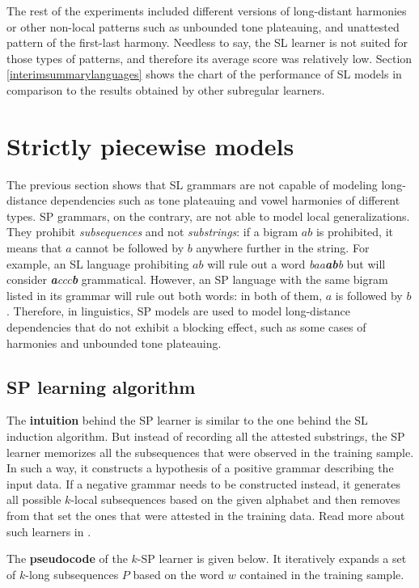 The rest of the experiments included different versions of long-distant harmonies or other non-local patterns such as unbounded tone plateauing, and unattested pattern of the first-last harmony.
Needless to say, the SL learner is not suited for those types of patterns, and therefore its average score was relatively low.
Section \ref{interimsummarylanguages} shows the chart of the performance of SL models in comparison to the results obtained by other subregular learners.

\section{Strictly piecewise models}

The previous section shows that SL grammars are not capable of modeling long-distance dependencies such as tone plateauing and vowel harmonies of different types.
SP grammars, on the contrary, are not able to model local generalizations.
They prohibit \emph{subsequences} and not \emph{substrings}: if a bigram $ab$ is prohibited, it means that $a$ cannot be followed by $b$ anywhere further in the string.
For example, an SL language prohibiting $ab$ will rule out a word \emph{baa\textbf{ab}b} but will consider \emph{\textbf{a}ccc\textbf{b}} grammatical.
However, an SP language with the same bigram listed in its grammar will rule out both words: in both of them, $a$ is followed by $b$.
Therefore, in linguistics, SP models are used to model long-distance dependencies that do not exhibit a blocking effect, such as some cases of harmonies and unbounded tone plateauing.


\subsection{SP learning algorithm}

The \textbf{intuition} behind the SP learner is similar to the one behind the SL induction algorithm.
But instead of recording all the attested substrings, the SP learner memorizes all the subsequences that were observed in the training sample.
In such a way, it constructs a hypothesis of a positive grammar describing the input data.
If a negative grammar needs to be constructed instead, it generates all possible $k$-local subsequences based on the given alphabet and then removes from that set the ones that were attested in the training data.
Read more about such learners in \citep{Heinz10ldp}.

The \textbf{pseudocode} of the $k$-SP learner is given below.
It iteratively expands a set of $k$-long subsequences $P$ based on the word $w$ contained in the training sample.

